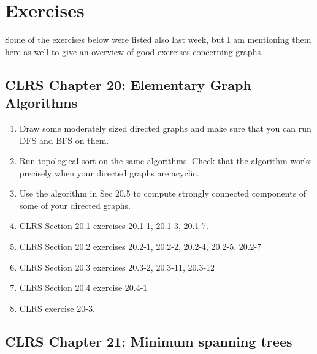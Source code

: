 \documentclass[12pt,a4paper]{article}
\theoremstyle{plain}
\theoremstyle{definition}
\begin{document}
\section*{Exercises}

Some of the exercises below were listed also last week, 
but I am mentioning them here as well to give an
overview of good exercises concerning graphs.

\subsection*{CLRS Chapter 20: Elementary Graph Algorithms}

\begin{enumerate}
\item
  Draw some moderately sized directed graphs
  and make sure that you can run DFS and BFS on them.
%   
%   

\item
  Run topological sort on the same algorithms. Check that
  the algorithm works precisely when your directed graphs are acyclic.

\item
  Use the algorithm in Sec 20.5 to compute strongly connected
  components of some of your directed graphs. 


\item
  CLRS Section 20.1 exercises
  20.1-1,  20.1-3, 20.1-7.

\item
  CLRS Section 20.2 exercises
  20.2-1, 20.2-2, 20.2-4, 20.2-5, 20.2-7

\item
  CLRS Section 20.3 exercises
  20.3-2, 20.3-11,  20.3-12

\item
  CLRS Section 20.4 exercise
  20.4-1

\item
  CLRS exercise 20-3.

\end{enumerate}

\subsection*{CLRS Chapter 21:
  Minimum spanning trees}
\end{document}

